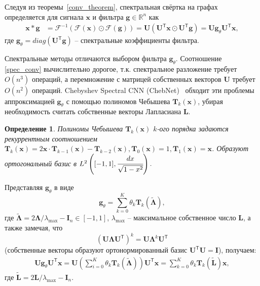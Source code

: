 \documentclass[14pt]{extarticle}
\newtheorem{Def}{Определение}
\begin{document}
Следуя из теоремы~\ref{conv_theorem}, спектральная свёртка на графах определяется для сигнала $\mathbf{x}$ и фильтра $\mathbf{g} \in \mathbb{R}^{n}$ как 
\begin{align}
\mathbf{x} * \mathbf{g} &=\mathscr{F}^{-1}(\mathscr{F}(\mathbf{x}) \odot \mathscr{F}(\mathbf{g})) =\mathbf{U}\left(\mathbf{U}^{\mathsf{T}} \mathbf{x} \odot \mathbf{U}^{\mathsf{T}} \mathbf{g}\right) = \mathbf{U g}_{\theta} \mathbf{U}^{\mathsf{T}} \mathbf{x},\label{spec_conv}
\end{align}
где $\mathbf{g}_{\theta} = diag\left(\mathbf{U}^{\mathsf{T}} \mathbf{g}\right)$ -- спектральные коэффициенты фильтра.

Спектральные методы отличаются выбором фильтра $\mathbf{g}_{\theta}$. Соотношение \eqref{spec_conv} вычислительно дорогое, т.к. спектральное разложение требует $O\left(n^{3}\right)$ операций, а перемножение с матрицей собственных векторов $\mathbf{U}$ требует $O\left(n^{2}\right)$ операций. Chebyshev Spectral CNN (ChebNet)~\cite{NIPS2016_6081} обходит эти проблемы аппроксимацией $\mathbf{g}_{\theta}$ с помощью полиномов Чебышева $\mathbf{T}_k\mathbf{(x)}$, убирая необходимость считать собственные векторы Лапласиана $\mathbf{L}$.

\begin{Def}
	\textit{Полиномы Чебышева} $\mathbf{T}_k\mathbf{(x)}$ $k$-ого порядка задаются рекуррентным соотношением  $ \mathbf{T}_{k}(\mathbf{x})=2 \mathbf{x} \cdot \mathbf{T}_{k-1}(\mathbf{x})-\mathbf{T}_{k-2}(\mathbf{x}), \mathbf{T}_{0}(\mathbf{x})=1, \mathbf{T}_{1}(\mathbf{x})=\mathbf{x}$. Образуют ортогональный базис в $L^{2}\left([-1,1], \cfrac{d x} {\sqrt{1-x^{2}}}\right).$
\end{Def}

Представляя $\mathbf{g}_{\theta}$ в виде 
\[\mathbf{g}_{\theta}=\sum_{k=0}^{K} \theta_{k} \mathbf{T}_{k}\mathbf{(\tilde{\Lambda})},	\]
где $\mathbf{\tilde{\Lambda}} = 2 \mathbf{\Lambda} / \lambda_{\max }-\mathbf{I}_{n} \in[-1,1]$, $\lambda_{\max }$ -- максимальное собственное число $\mathbf{L}$, а также замечая, что 
\[
\left(\mathbf{U} \mathbf{\Lambda} \mathbf{U}^{\mathsf{T}}\right)^{k}=\mathbf{U} \mathbf{\Lambda}^{k} \mathbf{U}^{\mathsf{T}}
\]
(собственные векторы образуют ортонормированный базис $\mathbf{U}^{\mathsf{T}}\mathbf{U}=\mathbf{I}$), получаем:
\begin{align}
\mathbf{U g}_{\theta} \mathbf{U}^{\mathsf{T}} \mathbf{x}=\mathbf{U}\left(\sum_{i=0}^{K} \theta_{k} \mathbf{T}_{k}(\tilde{\mathbf{\Lambda}})\right) \mathbf{U}^{\mathsf{T}} \mathbf{x} = \sum_{k=0}^{K} \theta_{k} \mathbf{T}_{k}(\tilde{\mathbf{L}}) \mathbf{x},
\label{cheb_appr}
\end{align}
где $\tilde{\mathbf{L}}=2 \mathbf{L} / \lambda_{\max }-\mathbf{I}_{n}$.
\end{document}

